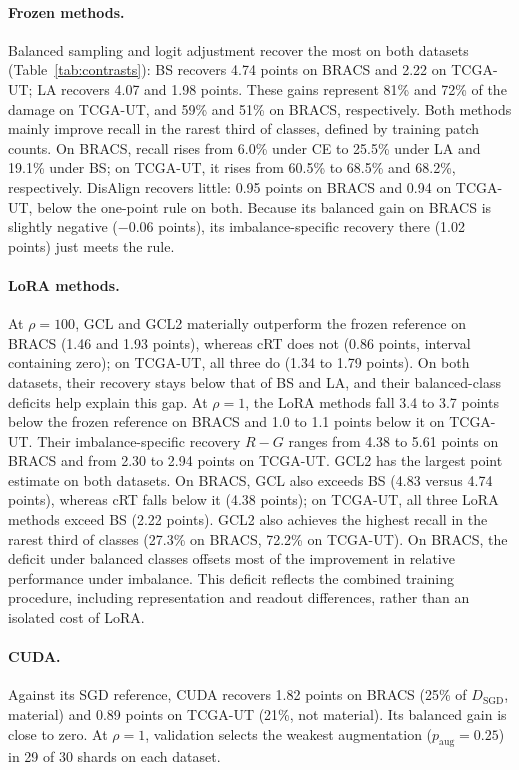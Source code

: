 \documentclass[11pt]{article}
\begin{document}
\paragraph{Frozen methods.}
Balanced sampling and logit adjustment recover the most on both datasets (Table~\ref{tab:contrasts}): BS recovers 4.74 points on BRACS and 2.22 on TCGA-UT; LA recovers 4.07 and 1.98 points. These gains represent 81\% and 72\% of the damage on TCGA-UT, and 59\% and 51\% on BRACS, respectively. Both methods mainly improve recall in the rarest third of classes, defined by training patch counts. On BRACS, recall rises from 6.0\% under CE to 25.5\% under LA and 19.1\% under BS; on TCGA-UT, it rises from 60.5\% to 68.5\% and 68.2\%, respectively. DisAlign recovers little: 0.95 points on BRACS and 0.94 on TCGA-UT, below the one-point rule on both. Because its balanced gain on BRACS is slightly negative ($-0.06$ points), its imbalance-specific recovery there (1.02 points) just meets the rule.

\paragraph{LoRA methods.}
At $\rho=100$, GCL and GCL2 materially outperform the frozen reference on BRACS (1.46 and 1.93 points), whereas cRT does not (0.86 points, interval containing zero); on TCGA-UT, all three do (1.34 to 1.79 points). On both datasets, their recovery stays below that of BS and LA, and their balanced-class deficits help explain this gap. At $\rho=1$, the LoRA methods fall 3.4 to 3.7 points below the frozen reference on BRACS and 1.0 to 1.1 points below it on TCGA-UT. Their imbalance-specific recovery $R-G$ ranges from 4.38 to 5.61 points on BRACS and from 2.30 to 2.94 points on TCGA-UT. GCL2 has the largest point estimate on both datasets. On BRACS, GCL also exceeds BS (4.83 versus 4.74 points), whereas cRT falls below it (4.38 points); on TCGA-UT, all three LoRA methods exceed BS (2.22 points). GCL2 also achieves the highest recall in the rarest third of classes (27.3\% on BRACS, 72.2\% on TCGA-UT). On BRACS, the deficit under balanced classes offsets most of the improvement in relative performance under imbalance. This deficit reflects the combined training procedure, including representation and readout differences, rather than an isolated cost of LoRA.

\paragraph{CUDA.}
Against its SGD reference, CUDA recovers 1.82 points on BRACS (25\% of $D_\mathrm{SGD}$, material) and 0.89 points on TCGA-UT (21\%, not material). Its balanced gain is close to zero. At $\rho=1$, validation selects the weakest augmentation ($p_{\mathrm{aug}}=0.25$) in 29 of 30 shards on each dataset.
\end{document}
